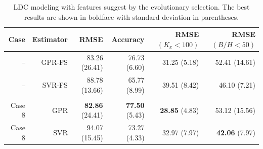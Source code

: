 \documentclass[a4paper,12pt, english]{article}
\begin{document}
 
\begin{table}[!]
\centering
\caption{\label{tab:results_new_set}  
LDC modeling with features suggest  by the evolutionary selection.
The best results are shown in boldface with standard deviation in parentheses. 
}
\begin{tabular}{rrrrrr}
\hline
Case      & Estimator &                 RMSE &           Accuracy   &    RMSE$(K_x<100)$ &       RMSE$(B/H<50)$    \\\hline                                                               
   --     &    GPR-FS &   {     83.26} (26.41) & {     76.73} (6.60) &       31.25 (5.18) &        52.41 (14.61)   \\
   --     &    SVR-FS &          88.78 (13.66) &        65.77 (8.99) &       39.51 (8.42) &    {     46.10} (7.21) \\\\
 Case 8 &       GPR &  { \bf 82.86} (24.41) &  { \bf 77.50} (5.43)&  { \bf 28.85} (4.83) &        53.12 (15.56)  \\
 Case 8 &       SVR &         94.07 (15.45) &         73.27 (4.33)&         32.97 (7.97) &  { \bf  42.06} (7.97)  \\
\hline 
\end{tabular} 
\end{table}
\end{document}
